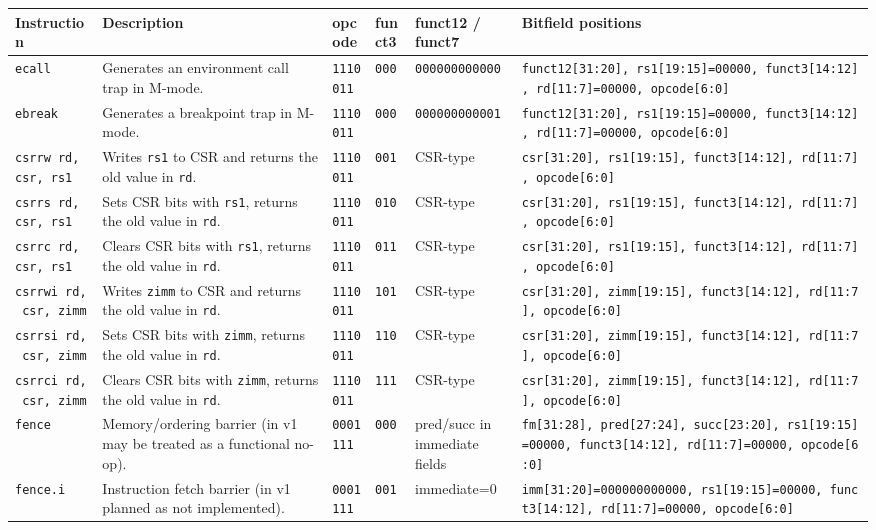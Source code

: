 \documentclass[]{article}
\begin{document}
\begin{longtable}[]{@{}llllll@{}}
\toprule
Instruction & Description & opcode & funct3 & funct12 / funct7 &
Bitfield positions\tabularnewline
\midrule
\endhead
\texttt{ecall} & Generates an environment call trap in M-mode. &
\texttt{1110011} & \texttt{000} & \texttt{000000000000} &
\texttt{funct12{[}31:20{]},\ rs1{[}19:15{]}=00000,\ funct3{[}14:12{]},\ rd{[}11:7{]}=00000,\ opcode{[}6:0{]}}\tabularnewline
\texttt{ebreak} & Generates a breakpoint trap in M-mode. &
\texttt{1110011} & \texttt{000} & \texttt{000000000001} &
\texttt{funct12{[}31:20{]},\ rs1{[}19:15{]}=00000,\ funct3{[}14:12{]},\ rd{[}11:7{]}=00000,\ opcode{[}6:0{]}}\tabularnewline
\texttt{csrrw\ rd,\ csr,\ rs1} & Writes \texttt{rs1} to CSR and returns
the old value in \texttt{rd}. & \texttt{1110011} & \texttt{001} &
CSR-type &
\texttt{csr{[}31:20{]},\ rs1{[}19:15{]},\ funct3{[}14:12{]},\ rd{[}11:7{]},\ opcode{[}6:0{]}}\tabularnewline
\texttt{csrrs\ rd,\ csr,\ rs1} & Sets CSR bits with \texttt{rs1},
returns the old value in \texttt{rd}. & \texttt{1110011} & \texttt{010}
& CSR-type &
\texttt{csr{[}31:20{]},\ rs1{[}19:15{]},\ funct3{[}14:12{]},\ rd{[}11:7{]},\ opcode{[}6:0{]}}\tabularnewline
\texttt{csrrc\ rd,\ csr,\ rs1} & Clears CSR bits with \texttt{rs1},
returns the old value in \texttt{rd}. & \texttt{1110011} & \texttt{011}
& CSR-type &
\texttt{csr{[}31:20{]},\ rs1{[}19:15{]},\ funct3{[}14:12{]},\ rd{[}11:7{]},\ opcode{[}6:0{]}}\tabularnewline
\texttt{csrrwi\ rd,\ csr,\ zimm} & Writes \texttt{zimm} to CSR and
returns the old value in \texttt{rd}. & \texttt{1110011} & \texttt{101}
& CSR-type &
\texttt{csr{[}31:20{]},\ zimm{[}19:15{]},\ funct3{[}14:12{]},\ rd{[}11:7{]},\ opcode{[}6:0{]}}\tabularnewline
\texttt{csrrsi\ rd,\ csr,\ zimm} & Sets CSR bits with \texttt{zimm},
returns the old value in \texttt{rd}. & \texttt{1110011} & \texttt{110}
& CSR-type &
\texttt{csr{[}31:20{]},\ zimm{[}19:15{]},\ funct3{[}14:12{]},\ rd{[}11:7{]},\ opcode{[}6:0{]}}\tabularnewline
\texttt{csrrci\ rd,\ csr,\ zimm} & Clears CSR bits with \texttt{zimm},
returns the old value in \texttt{rd}. & \texttt{1110011} & \texttt{111}
& CSR-type &
\texttt{csr{[}31:20{]},\ zimm{[}19:15{]},\ funct3{[}14:12{]},\ rd{[}11:7{]},\ opcode{[}6:0{]}}\tabularnewline
\texttt{fence} & Memory/ordering barrier (in v1 may be treated as a
functional no-op). & \texttt{0001111} & \texttt{000} & pred/succ in
immediate fields &
\texttt{fm{[}31:28{]},\ pred{[}27:24{]},\ succ{[}23:20{]},\ rs1{[}19:15{]}=00000,\ funct3{[}14:12{]},\ rd{[}11:7{]}=00000,\ opcode{[}6:0{]}}\tabularnewline
\texttt{fence.i} & Instruction fetch barrier (in v1 planned as not
implemented). & \texttt{0001111} & \texttt{001} & immediate=0 &
\texttt{imm{[}31:20{]}=000000000000,\ rs1{[}19:15{]}=00000,\ funct3{[}14:12{]},\ rd{[}11:7{]}=00000,\ opcode{[}6:0{]}}\tabularnewline
\bottomrule
\end{longtable}
\end{document}
